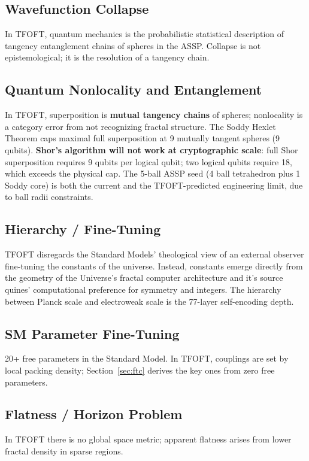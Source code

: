 \documentclass[11pt,a4paper]{article}
\begin{document}
\subsection{Wavefunction Collapse}
In TFOFT, quantum mechanics is the probabilistic statistical description of tangency entanglement chains of spheres in the ASSP. Collapse is not epistemological; it is the resolution of a tangency chain.

\subsection{Quantum Nonlocality and Entanglement}
In TFOFT, superposition is \textbf{mutual tangency chains} of spheres; nonlocality is a category error from not recognizing fractal structure. The Soddy Hexlet Theorem caps maximal
full superposition at 9 mutually tangent spheres (9 qubits). \textbf{Shor's algorithm will not work at cryptographic scale}: full Shor superposition requires 9 qubits per logical qubit; two logical qubits require 18, which exceeds the physical cap. The 5-ball ASSP seed (4 ball tetrahedron plus 1 Soddy core) is both the current  and the TFOFT-predicted engineering limit, due to ball radii constraints.   

\subsection{Hierarchy / Fine-Tuning}
TFOFT disregards the Standard Models' theological view of an external observer fine-tuning the constants of the universe. Instead, constants emerge directly from the geometry of the Universe's fractal computer architecture and it's source quines' computational preference for symmetry and integers. The hierarchy between Planck scale and electroweak scale is the 77-layer self-encoding depth.

\subsection{SM Parameter Fine-Tuning}
20+ free parameters in the Standard Model. In TFOFT, couplings are set by local packing density; Section~\ref{sec:ftc} derives the key ones from zero free
parameters.

\subsection{Flatness / Horizon Problem}
In TFOFT there is no global space metric; apparent flatness arises from lower fractal
density in sparse regions.
\end{document}

